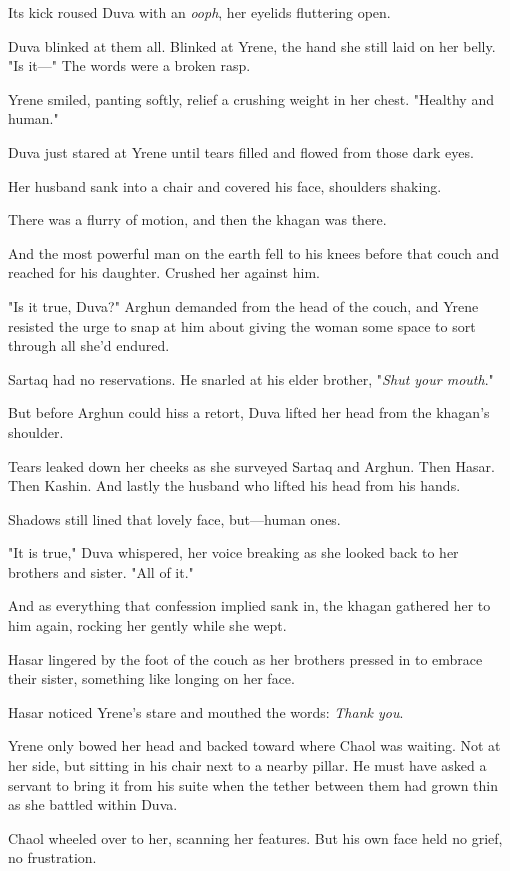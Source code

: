 Its kick roused Duva with an \emph{ooph}, her eyelids fluttering open.

Duva blinked at them all.
Blinked at Yrene, the hand she still laid on her belly.
"Is it---" The words were a broken rasp.

Yrene smiled, panting softly, relief a crushing weight in her chest.
"Healthy and human."

Duva just stared at Yrene until tears filled and flowed from those dark eyes.

Her husband sank into a chair and covered his face, shoulders shaking.

There was a flurry of motion, and then the khagan was there.

And the most powerful man on the earth fell to his knees before that couch and reached for his daughter.
Crushed her against him.

"Is it true, Duva?"
Arghun demanded from the head of the couch, and Yrene resisted the urge to snap at him about giving the woman some space to sort through all she'd endured.

Sartaq had no reservations.
He snarled at his elder brother, "\emph{Shut your mouth}."

But before Arghun could hiss a retort, Duva lifted her head from the khagan's shoulder.

Tears leaked down her cheeks as she surveyed Sartaq and Arghun.
Then Hasar.
Then Kashin.
And lastly the husband who lifted his head from his hands.

Shadows still lined that lovely face, but---human ones.

"It is true," Duva whispered, her voice breaking as she looked back to her brothers and sister.
"All of it."

And as everything that confession implied sank in, the khagan gathered her to him again, rocking her gently while she wept.

Hasar lingered by the foot of the couch as her brothers pressed in to embrace their sister, something like longing on her face.

Hasar noticed Yrene's stare and mouthed the words: \emph{Thank you}.

Yrene only bowed her head and backed toward where Chaol was waiting.
Not at her side, but sitting in his chair next to a nearby pillar.
He must have asked a servant to bring it from his suite when the tether between them had grown thin as she battled within Duva.

Chaol wheeled over to her, scanning her features.
But his own face held no grief, no frustration.

